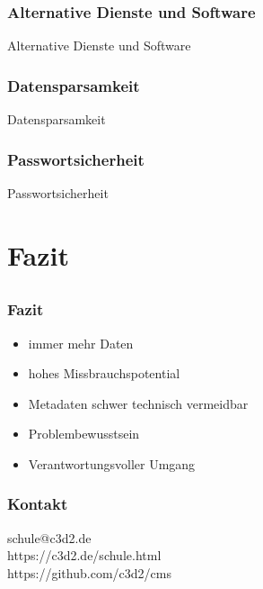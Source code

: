 \documentclass[12pt]{beamer}
\begin{document}
\begin{frame}
  \frametitle{Alternative Dienste und Software}
  \begin{center}
	\large{Alternative Dienste und Software}
  \end{center}
\end{frame}

\begin{frame}
  \frametitle{Datensparsamkeit}
  \begin{center}
	\large{Datensparsamkeit}
  \end{center}
\end{frame}

\begin{frame}
  \frametitle{Passwortsicherheit}
  \begin{center}
	\large{Passwortsicherheit}
  \end{center}
\end{frame}

\section{Fazit}
\subsection{}

\begin{frame}
  \frametitle{Fazit}
  \begin{itemize}
    \item<2-> immer mehr Daten
    \item<3-> hohes Missbrauchspotential
    \item<4-> Metadaten schwer technisch vermeidbar
    \item<5-> Problembewusstsein
    \item<6-> Verantwortungsvoller Umgang
  \end{itemize}
\end{frame}

\begin{frame}
  \frametitle{Kontakt}
  \begin{center}
    \huge schule@c3d2.de \\
    \large https://c3d2.de/schule.html \\
    https://github.com/c3d2/cms
  \end{center}
\end{frame}
\end{document}
